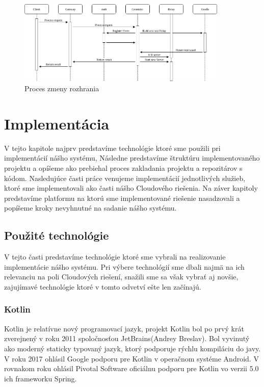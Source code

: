 \begin{figure}[!htbp]
	\centering
	\includegraphics[width=10cm]{img/api_operation_change.png}
	\caption{Proces zmeny rozhrania}
	\label{change_operation}
\end{figure}


\section{Implementácia}
V tejto kapitole najprv predstavíme technológie ktoré sme použili pri implementácií nášho systému, Následne predstavíme štruktúru implementovaného projektu a opíšeme ako prebiehal proces zakladania projektu a repozitárov s kódom. 
Nasledujúce časti práce venujeme implementácií jednotlivých služieb, ktoré sme implementovali ako časti nášho Cloudového riešenia.
Na záver kapitoly predstavíme  platformu na ktorú sme implementované riešenie nasadzovali a popíšeme kroky nevyhnutné na sadanie nášho systému.  

\subsection{Použité technológie}
V tejto časti predstavíme technológie ktoré sme vybrali na realizovanie implementácie nášho systému. Pri výbere technológií sme dbali najmä na ich relevanciu na poli Cloudových riešení, snažili sme sa však vybrať aj novšie, zajujímavé technológie ktoré v tomto odvetví ešte len začínajú. 

\subsubsection{Kotlin}
Kotlin je relatívne nový programovací jazyk, projekt Kotlin bol po prvý krát zverejnený v roku 2011 spoločnosťou JetBrains(Andrey Breslav). Bol vyvinutý ako moderný staticky typovaný jazyk, ktorý podporuje rýchlu kompiláciu do javy. V roku 2017 ohlásil Google podporu pre Kotlin v operačnom systéme Android. V rovnakom roku ohlásil Pivotal Software oficiálnu podporu pre Kotlin vo verzii 5.0 ich frameworku Spring.

